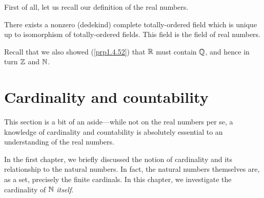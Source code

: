 First of all, let us recall our definition of the real numbers.
\begin{textequation}
There exists a nonzero (dedekind) complete totally-ordered field which is unique up to isomorphism of totally-ordered fields.  This field is the field of real numbers.
\end{textequation}
Recall that we also showed (\cref{prp1.4.52}) that $\mathbb{R}$ must contain $\mathbb{Q}$, and hence in turn $\mathbb{Z}$ and $\mathbb{N}$.

\section{Cardinality and countability}\label{CardinalityAndCountability}

This section is a bit of an aside---while not on the real numbers per se, a knowledge of cardinality and countability is absolutely essential to an understanding of the real numbers.

In the first chapter, we briefly discussed the notion of cardinality and its relationship to the natural numbers.  In fact, the natural numbers themselves are, as a set, precisely the finite cardinals.  In this chapter, we investigate the cardinality of $\mathbb{N}$ \emph{itself}.

